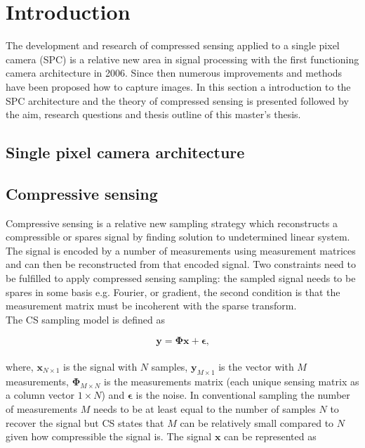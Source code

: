 \section{Introduction}
The development and research of compressed sensing applied to a single pixel camera (SPC) is a relative new area in signal processing with the first functioning camera architecture in 2006. Since then numerous improvements and methods have been proposed how to capture images. In this section a introduction to the SPC architecture and the theory of compressed sensing is presented followed by the aim, research questions and thesis outline of this master's thesis. 

\subsection{Single pixel camera architecture}


\subsection{Compressive sensing}
Compressive sensing is a relative new sampling strategy which reconstructs a compressible or spares signal by finding solution to undetermined linear system. The signal is encoded by a number of measurements using measurement matrices and can then be reconstructed from that encoded signal. Two constraints need to be fulfilled to apply compressed sensing sampling: the sampled signal needs to be spares in some basis e.g. Fourier, or gradient, the second condition is that the measurement matrix must be incoherent with the sparse transform.\\[0.1in]

The CS sampling model is defined as

\begin{equation}
\label{eq:CS1}
   \mathbf{ y = \Phi x + \epsilon}\text{,}
\end{equation}\\[0.1in]

where, $\mathbf{x}_{N\times1}$ is the signal with $N$ samples, $\mathbf{y}_{M\times1}$ is the vector with $M$ measurements, $\mathbf{\Phi}_{M \times N}$ is the measurements matrix (each unique sensing matrix as a column vector $1 \times N$) and $\mathbf{\epsilon}$ is the noise. In conventional sampling the number of measurements $M$ needs to be at least equal to the number of samples $N$ to recover the signal but CS states that $M$ can be relatively small compared to $N$ given how compressible the signal is. The signal $\mathbf{x}$ can be represented as  

